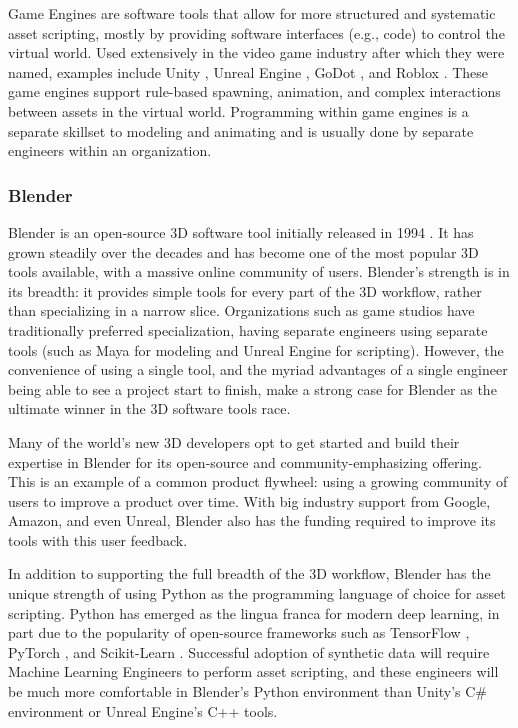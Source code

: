 \documentclass{article}
\begin{document}
Game Engines are software tools that allow for more structured and systematic asset scripting, mostly by providing software interfaces (e.g., code) to control the virtual world. Used extensively in the video game industry after which they were named, examples include Unity \cite{unity3d}, Unreal Engine \cite{unrealengine}, GoDot \cite{godot}, and Roblox \cite{roblox}. These game engines support rule-based spawning, animation, and complex interactions between assets in the virtual world. Programming within game engines is a separate skillset to modeling and animating and is usually done by separate engineers within an organization.

\subsubsection{Blender}
\label{sec:blender}

Blender is an open-source 3D software tool initially released in 1994 \cite{blender}. It has grown steadily over the decades and has become one of the most popular 3D tools available, with a massive online community of users. Blender’s strength is in its breadth: it provides simple tools for every part of the 3D workflow, rather than specializing in a narrow slice. Organizations such as game studios have traditionally preferred specialization, having separate engineers using separate tools (such as Maya for modeling and Unreal Engine for scripting). However, the convenience of using a single tool, and the myriad advantages of a single engineer being able to see a project start to finish, make a strong case for Blender as the ultimate winner in the 3D software tools race. 

Many of the world’s new 3D developers opt to get started and build their expertise in Blender for its open-source and community-emphasizing offering. This is an example of a common product flywheel: using a growing community of users to improve a product over time. With big industry support from Google, Amazon, and even Unreal, Blender also has the funding required to improve its tools with this user feedback.

In addition to supporting the full breadth of the 3D workflow, Blender has the unique strength of using Python as the programming language of choice for asset scripting. Python has emerged as the lingua franca for modern deep learning, in part due to the popularity of open-source frameworks such as TensorFlow \cite{tensorflow}, PyTorch \cite{pytorch}, and Scikit-Learn \cite{scikit-learn}. Successful adoption of synthetic data will require Machine Learning Engineers to perform asset scripting, and these engineers will be much more comfortable in Blender’s Python environment than Unity's C\# environment or Unreal Engine’s C++ tools.
\end{document}
